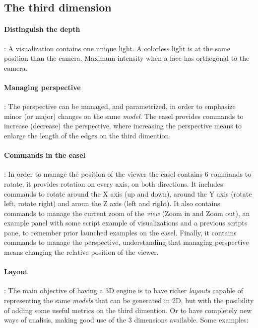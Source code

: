 \documentclass{sig-alternate}
\newcommand{\seclabel}[1]{\label{sec:#1}}
\begin{document}
\subsection{The third dimension} \seclabel{3d}

\paragraph{Distinguish the depth}: 
A visualization contains one unique light. 
A colorless light is at the same position than the camera. 
Maximum intensity when a face has orthogonal to the camera.

\paragraph{Managing perspective}:
The perspective can be managed, and parametrized,
in order to emphasize minor (or major) changes on the same
\emph{model}. The easel provides commands to increase 
(decrease) the perspective, where increasing the
perspective means to enlarge the length of the edges on the
third dimention. 

\paragraph{Commands in the easel}: 
In order to manage the position of the viewer the easel 
contains 6 commands to rotate, it provides rotation on 
every axis, on both directions. It includes commands
to rotate around the X axis (up and down), around the
Y axis (rotate left, rotate right) and aroun the Z axis
(left and right). It also contains commands to manage
the current zoom of the \emph{view} (Zoom in and Zoom out),
an example panel with some script example of visualizations
and a previous scripts pane, to remember prior launched examples
on the easel. Finally, it contains commands to manage the 
perspective, understanding that managing perspective means
changing the relative position of the viewer.  
   

\paragraph{Layout}:
The main objective of having a 3D engine is to have richer 
\emph{layouts} capable of representing the same \emph{models} 
that can be generated in 2D, but with the posibility of adding 
some useful metrics on the third dimention. Or to have 
completely new ways of analisis, making good use of the 3 
dimensions available.
Some examples:
\end{document}
